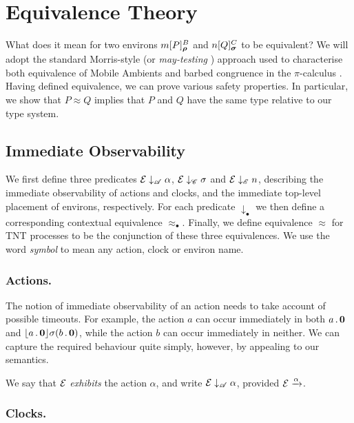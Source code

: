 \documentclass[orivec,envcountsame]{llncs}
\newcommand{\Exhibits}[1]{\mathrel{\downarrow_{#1}}}
\newcommand{\ExhibitsA}{\Exhibits{\mathscr{A}}}
\newcommand{\ExhibitsC}{\Exhibits{\mathscr{C}}}
\newcommand{\ExhibitsE}{\Exhibits{\mathscr{E}}}
\newcommand{\Eq}{\approx}
\newcommand{\Does}[1]{\xderives{#1}}
\begin{document}
\section{Equivalence Theory}
\label{sec:equivalence-theory}

What does it mean for two environs $\locv{m}{P}{B}{\vec\rho}$ and
$\locv{n}{Q}{C}{\vec\sigma}$ to be equivalent? We will adopt the standard Morris-style  \cite{Mor68} (or \emph{may-testing} \cite{DNH84}) approach used to characterise
both equivalence of Mobile Ambients \cite{GC99} and barbed congruence in the
$\pi$-calculus \cite{SW01}. Having defined equivalence, we can prove various
safety properties. In particular, we show that $P \Eq Q$ implies that $P$ and
$Q$ have the same type relative to our type system.

\subsection{Immediate Observability}
\label{sec:immediate-observability}

We first define three predicates $\expr \ExhibitsA \alpha$, $\expr \ExhibitsC
\sigma$ and $\expr \ExhibitsE n$, describing the immediate observability of
actions and clocks, and the immediate top-level placement of environs,
respectively. For each predicate $\Exhibits{\bullet}$ we then define a
corresponding contextual equivalence $\Eq_{\bullet}$. Finally, we define
equivalence $\Eq$ for TNT processes to be the conjunction of these three
equivalences. We use the word \emph{symbol} to mean any action, clock or environ
name.

\subsubsection{Actions.}
The notion of immediate observability of an action needs to take account of possible timeouts. For example, the action $a$ can occur immediately in both $a\,.\,\textbf{0}$ and $\lfloor{a\,.\,\textbf{0}}\rfloor {\sigma} ({b\,.\,\textbf{0}})$, while the action $b$ can occur immediately in neither. We can capture the required behaviour quite simply, however, by appealing to our semantics.

\begin{definition}
We say that $\text{$\mathcal{E}$}$ \emph{exhibits} the action $\alpha$, and write $\expr \ExhibitsA \alpha$, provided $\expr \Does{\alpha}$.
\end{definition}


\subsubsection{Clocks.} 
\end{document}
